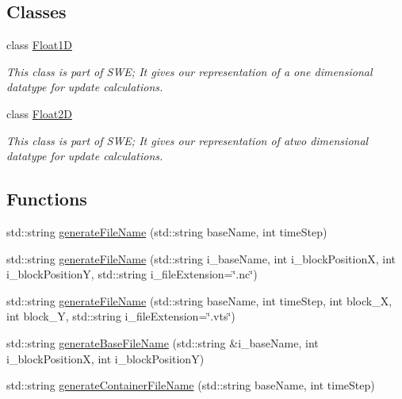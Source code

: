 \subsection*{Classes}
\begin{DoxyCompactItemize}
\item 
class \hyperlink{classFloat1D}{Float1D}
\begin{DoxyCompactList}\small\item\em This class is part of S\+WE; It gives our representation of a one dimensional datatype for update calculations. \end{DoxyCompactList}\item 
class \hyperlink{classFloat2D}{Float2D}
\begin{DoxyCompactList}\small\item\em This class is part of S\+WE; It gives our representation of atwo dimensional datatype for update calculations. \end{DoxyCompactList}\end{DoxyCompactItemize}
\subsection*{Functions}
\begin{DoxyCompactItemize}
\item 
std\+::string \hyperlink{help_8hh_aa10dc278c6ac60f9cd49955cbe16fbcb}{generate\+File\+Name} (std\+::string base\+Name, int time\+Step)
\item 
std\+::string \hyperlink{help_8hh_a206f33ce37fa47f8635d02a1cfc9881f}{generate\+File\+Name} (std\+::string i\+\_\+base\+Name, int i\+\_\+block\+PositionX, int i\+\_\+block\+PositionY, std\+::string i\+\_\+file\+Extension=\char`\"{}.nc\char`\"{})
\item 
std\+::string \hyperlink{help_8hh_ab05bce4e4d30d0b9fb85f81668f98f79}{generate\+File\+Name} (std\+::string base\+Name, int time\+Step, int block\+\_\+X, int block\+\_\+Y, std\+::string i\+\_\+file\+Extension=\char`\"{}.vts\char`\"{})
\item 
std\+::string \hyperlink{help_8hh_a7dc37444a6b7771aefff04a38e74e086}{generate\+Base\+File\+Name} (std\+::string \&i\+\_\+base\+Name, int i\+\_\+block\+PositionX, int i\+\_\+block\+PositionY)
\item 
std\+::string \hyperlink{help_8hh_a427928180ec14bf889c55e5cc51d8e36}{generate\+Container\+File\+Name} (std\+::string base\+Name, int time\+Step)
\end{DoxyCompactItemize}


